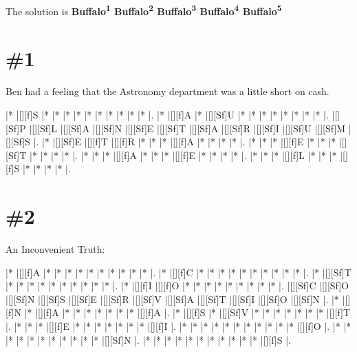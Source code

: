 \documentclass[letterpaper]{article}
\begin{document}
The solution is \textbf{Buffalo\textsuperscript{1} Buffalo\textsuperscript{2} Buffalo\textsuperscript{3} Buffalo\textsuperscript{4} Buffalo\textsuperscript{5}}

\newpage
\section*{\#1}
Ben had a feeling that the Astronomy department was a little short on cash.
\vspace*{1em}
\begin{Puzzle}{12}{8}
|*        |[][f]S   |*        |*        |*        |*        |*        |*        |*        |*        |*        |*        |.
|*        |[][f]A   |*        |[][Sf]U  |*        |*        |*        |*        |*        |*        |*        |*        |.
|[][Sf]P  |[][Sf]L  |[][Sf]A  |[][Sf]N  |[][Sf]E  |[][Sf]T  |[][Sf]A  |[][Sf]R  |[][Sf]I  |[][Sf]U  |[][Sf]M  |[][Sf]S  |.
|*        |[][Sf]E  |[][f]T   |[][f]R   |*        |*        |*        |[][f]A   |*        |*        |*        |*        |.
|*        |*        |*        |[][f]E   |*        |*        |*        |[][Sf]T  |*        |*        |*        |*        |.
|*        |*        |*        |[][f]A   |*        |*        |*        |[][f]E   |*        |*        |*        |*        |.
|*        |*        |*        |[][f]L   |*        |*        |*        |[][f]S   |*        |*        |*        |*        |.
\end{Puzzle}

\vspace*{-0.5cm}
\section*{\#2}

An Inconvenient Truth:
\vspace*{1em}
\begin{Puzzle}{12}{11}
|*        |[][f]A   |*        |*        |*        |*        |*        |*        |*        |*        |*        |*        |. 
|*        |[][f]C   |*        |*        |*        |*        |*        |*        |*        |*        |*        |*        |.  
|*        |[][Sf]T  |*        |*        |*        |*        |*        |*        |*        |*        |*        |*        |.
|*        |[][f]I   |[][f]O   |*        |*        |*        |*        |*        |*        |*        |*        |*        |.  
|[][Sf]C  |[][Sf]O  |[][Sf]N  |[][Sf]S  |[][Sf]E  |[][Sf]R  |[][Sf]V  |[][Sf]A  |[][Sf]T  |[][Sf]I  |[][Sf]O  |[][Sf]N  |.
|*        |[][f]N   |*        |[][f]A   |*        |*        |*        |*        |*        |*        |*        |[][f]A   |. 
|*        |[][f]S   |*        |[][Sf]V  |*        |*        |*        |*        |*        |*        |*        |[][f]T   |.
|*        |*        |*        |[][f]E   |*        |*        |*        |*        |*        |*        |*        |[][f]I   |.
|*        |*        |*        |*        |*        |*        |*        |*        |*        |*        |*        |[][f]O   |.
|*        |*        |*        |*        |*        |*        |*        |*        |*        |*        |*        |[][Sf]N  |.
|*        |*        |*        |*        |*        |*        |*        |*        |*        |*        |*        |[][f]S   |.
\end{Puzzle}
\end{document}
